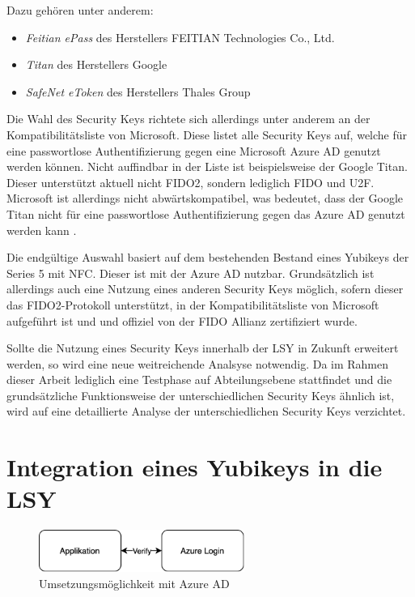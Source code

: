 Dazu gehören unter anderem:
\begin{itemize}
    \item \textit{Feitian ePass} des Herstellers FEITIAN Technologies Co., Ltd.
    \item \textit{Titan} des Herstellers Google
    \item \textit{SafeNet eToken} des Herstellers Thales Group
\end{itemize}

Die Wahl des Security Keys richtete sich allerdings unter anderem an der Kompatibilitätsliste \cite{compWin} von Microsoft. Diese listet alle Security Keys auf, welche für eine passwortlose Authentifizierung gegen eine Microsoft Azure \ac{AD} genutzt werden können. Nicht auffindbar in der Liste ist beispielsweise der Google Titan. Dieser unterstützt aktuell nicht FIDO2, sondern lediglich FIDO und \ac{U2F}. Microsoft ist allerdings nicht abwärtskompatibel, was bedeutet, dass der Google Titan nicht für eine passwortlose Authentifizierung gegen das Azure \ac{AD} genutzt werden kann \cite{seckeytest}.

Die endgültige Auswahl basiert auf dem bestehenden Bestand eines Yubikeys der Series 5 mit NFC. Dieser ist mit der Azure \ac{AD} nutzbar. Grundsätzlich ist allerdings auch eine Nutzung eines anderen Security Keys möglich, sofern dieser das \ac{FIDO}2-Protokoll unterstützt, in der Kompatibilitätsliste von Microsoft aufgeführt ist und und offiziel von der \ac{FIDO} Allianz zertifiziert wurde.

Sollte die Nutzung eines Security Keys innerhalb der \ac{LSY} in Zukunft erweitert werden, so wird eine neue weitreichende Analsyse notwendig. Da im Rahmen dieser Arbeit lediglich eine Testphase auf Abteilungsebene stattfindet und die grundsätzliche Funktionsweise der unterschiedlichen Security Keys ähnlich ist, wird auf eine detaillierte Analyse der unterschiedlichen Security Keys verzichtet.

\section{Integration eines Yubikeys in die LSY}

\begin{figure}[h]
	\centering 
	\includegraphics[width=0.6\textwidth]{img/abbildungen/azure_umsetzung.png}
	\captionsetup{format=hang}
	\caption{Umsetzungsmöglichkeit mit Azure \ac{AD}}
\end{figure}

